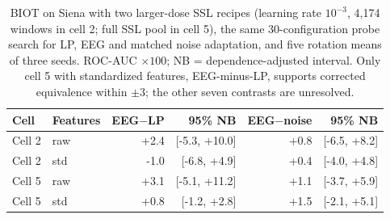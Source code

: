 \begin{table}[!htbp]
\caption{BIOT on Siena with two larger-dose SSL recipes (learning rate $10^{-3}$, 4,174 windows in cell 2; full SSL pool in cell 5), the same 30-configuration probe search for LP, EEG and matched noise adaptation, and five rotation means of three seeds. ROC-AUC $\times100$; NB = dependence-adjusted interval. Only cell 5 with standardized features, EEG-minus-LP, supports corrected equivalence within $\pm3$; the other seven contrasts are unresolved.}
\label{tab:d32}
\centering\footnotesize
\setlength{\tabcolsep}{3pt}
\begin{tabular}{llrrrr}
\toprule
Cell & Features & EEG$-$LP & 95\% NB & EEG$-$noise & 95\% NB\\
\midrule
Cell 2 & raw & +2.4 & [-5.3, +10.0] & +0.8 & [-6.5, +8.2]\\
Cell 2 & std & -1.0 & [-6.8, +4.9] & +0.4 & [-4.0, +4.8]\\
Cell 5 & raw & +3.1 & [-5.1, +11.2] & +1.1 & [-3.7, +5.9]\\
Cell 5 & std & +0.8 & [-1.2, +2.8] & +1.5 & [-2.1, +5.1]\\
\bottomrule
\end{tabular}
\end{table}
